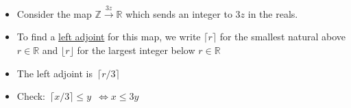 
\begin{itemize}
    \item  Consider the map $\mathbb{Z} \xrightarrow{3z} \mathbb{R}$ which sends an integer to $3z$ in the reals.
    \item To find a \href{doc/1 math/Seven Sketches in Compositionality/Chapter 1: Generative Effects/6 Galois connections/1 Definition and examples/Galois connection}{left adjoint} for this map, we write $\lceil r \rceil$ for the smallest natural above $r \in \mathbb{R}$ and $\lfloor r \rfloor$ for the largest integer below $r \in \mathbb{R}$
    \item The left adjoint is \,$\lceil r/3 \rceil$\,
    \item Check: \,$\lceil x/3 \rceil \leq y$\, $\iff x \leq 3y$
  \end{itemize}
